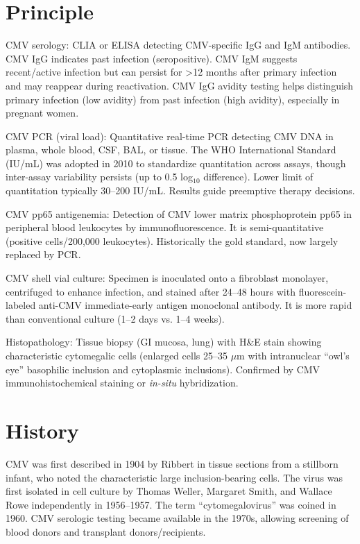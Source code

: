 \section*{Principle}
CMV serology: CLIA or ELISA detecting CMV-specific IgG and IgM antibodies. CMV IgG indicates past infection (seropositive). CMV IgM suggests recent/active infection but can persist for >12 months after primary infection and may reappear during reactivation. CMV IgG avidity testing helps distinguish primary infection (low avidity) from past infection (high avidity), especially in pregnant women.

CMV PCR (viral load): Quantitative real-time PCR detecting CMV DNA in plasma, whole blood, CSF, BAL, or tissue. The WHO International Standard (IU/mL) was adopted in 2010 to standardize quantitation across assays, though inter-assay variability persists (up to 0.5 log$_{10}$ difference). Lower limit of quantitation typically 30--200 IU/mL. Results guide preemptive therapy decisions.

CMV pp65 antigenemia: Detection of CMV lower matrix phosphoprotein pp65 in peripheral blood leukocytes by immunofluorescence. It is semi-quantitative (positive cells/200,000 leukocytes). Historically the gold standard, now largely replaced by PCR.

CMV shell vial culture: Specimen is inoculated onto a fibroblast monolayer, centrifuged to enhance infection, and stained after 24--48 hours with fluorescein-labeled anti-CMV immediate-early antigen monoclonal antibody. It is more rapid than conventional culture (1--2 days vs. 1--4 weeks).

Histopathology: Tissue biopsy (GI mucosa, lung) with H\&E stain showing characteristic cytomegalic cells (enlarged cells 25--35 $\mu$m with intranuclear ``owl's eye'' basophilic inclusion and cytoplasmic inclusions). Confirmed by CMV immunohistochemical staining or \textit{in-situ} hybridization.

\section*{History}
CMV was first described in 1904 by Ribbert in tissue sections from a stillborn infant, who noted the characteristic large inclusion-bearing cells. The virus was first isolated in cell culture by Thomas Weller, Margaret Smith, and Wallace Rowe independently in 1956--1957. The term ``cytomegalovirus'' was coined in 1960. CMV serologic testing became available in the 1970s, allowing screening of blood donors and transplant donors/recipients.

